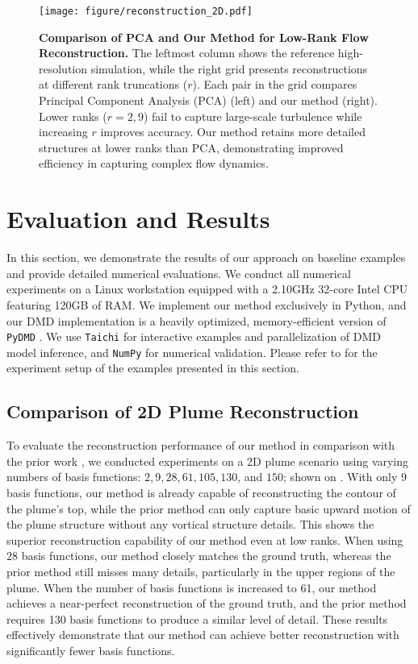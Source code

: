 \begin{figure}[!ht]
    \centering
    \texttt{[image: figure/reconstruction\_2D.pdf]}
    \caption{\textbf{Comparison of PCA and Our Method for Low-Rank Flow Reconstruction.} The leftmost column shows the reference high-resolution simulation, while the right grid presents reconstructions at different rank truncations ($r$). Each pair in the grid compares Principal Component Analysis (PCA) (left) and our method (right). Lower ranks ($r=2,9$) fail to capture large-scale turbulence while increasing \(r\) improves accuracy. Our method retains more detailed structures at lower ranks than PCA, demonstrating improved efficiency in capturing complex flow dynamics.}
    \label{fig:reconstruction}
    \Description{}
\end{figure}

\section{Evaluation and Results}
\label{sec:results}
In this section, we demonstrate the results of our approach on baseline examples and provide detailed numerical evaluations.
We conduct all numerical experiments on a Linux workstation equipped with a 2.10GHz 32-core Intel CPU featuring 120GB of RAM. We implement our method exclusively in Python, and our DMD implementation is a heavily optimized, memory-efficient version of \texttt{PyDMD} \cite{ichinaga2024pydmd}. We use \texttt{Taichi} \cite{hu2019taichi} for interactive examples and parallelization of DMD model inference, and \texttt{NumPy} \cite{harris2020array} for numerical validation. Please refer to  for the experiment setup of the examples presented in this section.

\subsection{Comparison of 2D Plume Reconstruction}
To evaluate the reconstruction performance of our method in comparison with the prior work \cite{kim2013subspace}, we conducted experiments on a 2D plume scenario using varying numbers of basis functions: $2, 9, 28, 61, 105, 130$, and $150$; shown on . With only 9 basis functions, our method is already capable of reconstructing the contour of the plume's top, while the prior method can only capture basic upward motion of the plume structure without any vortical structure details. This shows the superior reconstruction capability of our method even at low ranks. When using $28$ basis functions, our method closely matches the ground truth, whereas the prior method still misses many details, particularly in the upper regions of the plume. When the number of basis functions is increased to 61, our method achieves a near-perfect reconstruction of the ground truth, and the prior method requires 130 basis functions to produce a similar level of detail. These results effectively demonstrate that our method can achieve better reconstruction with significantly fewer basis functions.

